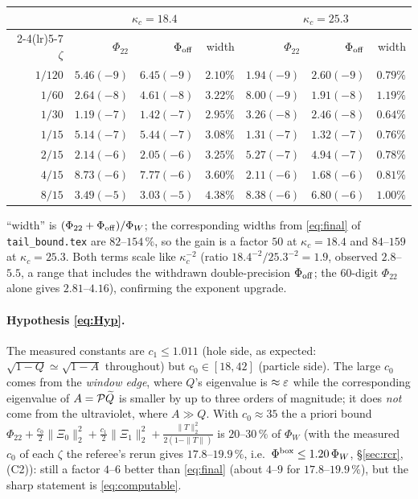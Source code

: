 \documentclass[11pt]{article}
\begin{document}
\begin{center}\small
\begin{tabular}{r rr rr rr}\toprule
&\multicolumn{3}{c}{$\kappa_c=18.4$}&\multicolumn{3}{c}{$\kappa_c=25.3$}\\
\cmidrule(lr){2-4}\cmidrule(lr){5-7}
$\zeta$&$\Phi_{22}$&$\Phi_{\rm off}$&width&$\Phi_{22}$&$\Phi_{\rm off}$&width\\\midrule
$1/120$&$5.46(-9)$&$6.45(-9)$&$2.10\%$&$1.94(-9)$&$2.60(-9)$&$0.79\%$\\
$1/60$ &$2.64(-8)$&$4.61(-8)$&$3.22\%$&$8.00(-9)$&$1.91(-8)$&$1.19\%$\\
$1/30$ &$1.19(-7)$&$1.42(-7)$&$2.95\%$&$3.26(-8)$&$2.46(-8)$&$0.64\%$\\
$1/15$ &$5.14(-7)$&$5.44(-7)$&$3.08\%$&$1.31(-7)$&$1.32(-7)$&$0.76\%$\\
$2/15$ &$2.14(-6)$&$2.05(-6)$&$3.25\%$&$5.27(-7)$&$4.94(-7)$&$0.78\%$\\
$4/15$ &$8.73(-6)$&$7.77(-6)$&$3.60\%$&$2.11(-6)$&$1.68(-6)$&$0.81\%$\\
$8/15$ &$3.49(-5)$&$3.03(-5)$&$4.38\%$&$8.38(-6)$&$6.80(-6)$&$1.00\%$\\
\bottomrule\end{tabular}
\end{center}
``width'' is $(\Phi_{22}+\Phi_{\rm off})/\Phi_W$; the corresponding widths from \eqref{eq:final} of
\texttt{tail\_bound.tex} are $82$--$154\,\%$, so the gain is a factor $50$ at $\kappa_c=18.4$ and
$84$--$159$ at $\kappa_c=25.3$.  Both terms scale like $\kappa_c^{-2}$ (ratio $18.4^{-2}/25.3^{-2}=1.9$,
observed $2.8$--$5.5$, a range that includes the withdrawn double-precision $\Phi_{\rm off}$; the $60$-digit $\Phi_{22}$ alone gives $2.81$--$4.16$), confirming the exponent upgrade.

\paragraph{Hypothesis \eqref{eq:Hyp}.}  The measured constants are $c_1\le1.011$ (hole side, as
expected: $\sqrt{1-Q}\simeq\sqrt{1-A}$ throughout) but $c_0\in[18,42]$ (particle side).  The large
$c_0$ comes from the \emph{window edge}, where $Q$'s eigenvalue is $\approx\varepsilon$ while the
corresponding eigenvalue of $A=\mathcal P\widetilde Q$ is smaller by up to three orders of magnitude; it
does \emph{not} come from the ultraviolet, where $A\gg Q$.  With $c_0\approx35$ the a priori bound
$\Phi_{22}+\frac{c_0}2\|\Xi_0\|_2^2+\frac{c_1}2\|\Xi_1\|_2^2+\frac{\|T\|_2^2}{2(1-\|T\|)}$ is
$20$--$30\,\%$ of $\Phi_W$ (with the measured $c_0$ of each $\zeta$ the referee's rerun gives $17.8$--$19.9\,\%$, i.e.\ $\Phi^{\rm box}\le1.20\,\Phi_W$, \S\ref{sec:rcr}, (C2)): still a factor $4$--$6$ better than \eqref{eq:final} (about $4$--$9$ for $17.8$--$19.9\,\%$), but the sharp
statement is \eqref{eq:computable}.
\end{document}
